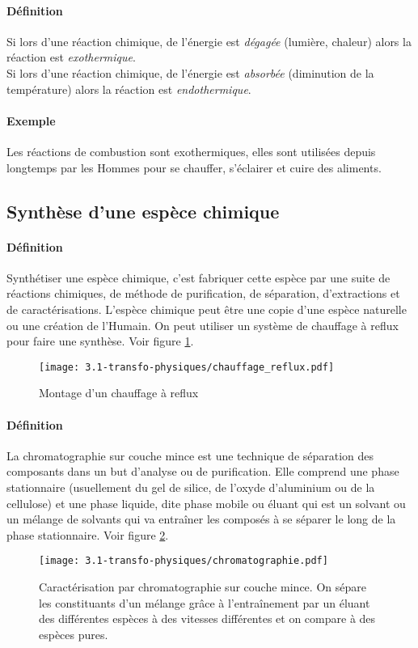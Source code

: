 \paragraph{Définition}
Si lors d'une réaction chimique, de l'énergie est \textit{dégagée} (lumière, chaleur) alors la réaction est \textit{exothermique}. \\
Si lors d'une réaction chimique, de l'énergie est \textit{absorbée} (diminution de la température) alors la réaction est \textit{endothermique}. \\
\paragraph{Exemple}
Les réactions de combustion sont exothermiques, elles sont utilisées depuis longtemps par les Hommes pour se chauffer, s'éclairer et cuire des aliments.

\subsection{Synthèse d'une espèce chimique}
\paragraph{Définition} Synthétiser une espèce chimique, c'est fabriquer cette espèce par une suite de réactions chimiques, de méthode de purification, de séparation, d'extractions et de caractérisations. L'espèce chimique peut être une copie d'une espèce naturelle ou une création de l'Humain. On peut utiliser un système de chauffage à reflux pour faire une synthèse. Voir figure \ref{fig:chauffage-reflux}.
\begin{figure}[!h]
  \begin{center}
      \texttt{[image: 3.1-transfo-physiques/chauffage\_reflux.pdf]}
  \end{center}
  \caption{Montage d'un chauffage à reflux}
  \label{fig:chauffage-reflux}
\end{figure}
\paragraph{Définition} La chromatographie sur couche mince est une technique de séparation des composants dans un but d'analyse ou de purification. Elle comprend une phase stationnaire (usuellement du gel de silice, de l'oxyde d'aluminium ou de la cellulose) et 
une phase liquide, dite phase mobile ou éluant qui est un solvant ou un mélange de solvants qui va entraîner les composés à se séparer le long de la phase stationnaire. Voir figure \ref{fig:chromatographie}.
\begin{figure}[!h]
  \begin{center}
      \texttt{[image: 3.1-transfo-physiques/chromatographie.pdf]}
  \end{center}
  \caption{Caractérisation par chromatographie sur couche mince. On sépare les constituants d'un mélange grâce à l’entraînement par un éluant des différentes espèces à des vitesses différentes et on compare à des espèces pures.}
  \label{fig:chromatographie}
\end{figure}

